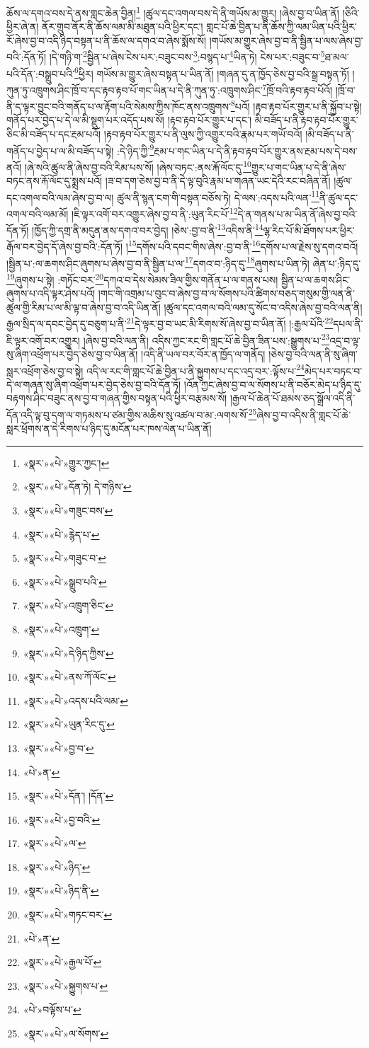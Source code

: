 ཆོས་ལ་དགའ་བས་དེ་ནས་གླང་ཆེན་བྱིན།\footnote{«སྣར་»«པེ་»གྱུར་ཀྱང་།} །ཚུལ་དང་འགལ་བས་དེ་ནི་གཡོས་མ་གྱུར། །ཞེས་བྱ་བ་ཡིན་ནོ། །ཅིའི་ཕྱིར་ཞེ་ན། ནོར་གྲུབ་ནོར་ནི་ཆོས་ལམ་མི་མཐུན་པའི་ཕྱིར་དང་། གླང་པོ་ཆེ་བྱིན་པ་ནི་ཆོས་ཀྱི་ལམ་ཡིན་པའི་ཕྱིར་རོ་ཞེས་བྱ་བ་འདི་ཉིད་བསྟན་པ་ནི་ཆོས་ལ་དགའ་བ་ཞེས་སྨོས་སོ། །གཡོས་མ་གྱུར་ཞེས་བྱ་བ་ནི་སྦྱིན་པ་ལས་ཞེས་བྱ་བའི་:དོན་ཏོ། །དེ་གཉི་ག་\footnote{«སྣར་»«པེ་»དོན་ཏེ། དེ་གཉིས་}སྦྱིན་པ་ཞེས་ངེས་པར་:བཟུང་བས་\footnote{«སྣར་»«པེ་»གཟུང་བས་}:བསྙད་པ་\footnote{«སྣར་»«པེ་»རྙེད་པ་}ཡིན་ཏེ། ངེས་པར་:བཟུང་བ་\footnote{«སྣར་»«པེ་»གཟུང་བ་}ཐ་མལ་པའི་དོན་:བསྒྲུབ་པའི་\footnote{«སྣར་»«པེ་»སྒྲུབ་པའི་}ཕྱིར། གཡོས་མ་གྱུར་ཞེས་བསྟན་པ་ཡིན་ནོ། །གཞན་དུ་ན་ཁྱོད་ཅེས་བྱ་བའི་སྒྲ་བསྟན་ཏོ། །ཀུན་ཏུ་འཁྲུགས་ཤིང་ཁྲོ་བ་དང་རྟབ་རྟབ་པོ་གང་ཡིན་པ་དེ་ནི་ཀུན་ཏུ་:འཁྲུགས་ཤིང་\footnote{«སྣར་»«པེ་»འཁྲུག་ཅིང་}ཁྲོ་བའི་རྟབ་རྟབ་པོའོ། །ཁྲོ་བ་ནི་ད་ལྟར་བྱུང་བའི་གནོད་པ་ལ་རྟོག་པའི་སེམས་ཀྱིས་ཁོང་ནས་འཁྲུགས་\footnote{«སྣར་»«པེ་»འཁྲུག་}པའོ། །རྟབ་རྟབ་པོར་གྱུར་པ་ནི་སྐྱོབ་པ་སྟེ། གནོད་པར་བྱེད་པ་དེ་ལ་མི་སྡུག་པར་འདོད་པས་སོ། །རྟབ་རྟབ་པོར་གྱུར་པ་དང་། མི་བཟོད་པ་ནི་རྟབ་རྟབ་པོར་གྱུར་ཅིང་མི་བཟོད་པ་དང་རྔམ་པའོ། །རྟབ་རྟབ་པོར་གྱུར་པ་ནི་ལུས་ཀྱི་འགྱུར་བའི་རྣམ་པར་གཡོ་བའོ། །མི་བཟོད་པ་ནི་གནོད་པ་བྱེད་པ་ལ་མི་བཟོད་པ་སྟེ། :དེ་ཉིད་ཀྱི་\footnote{«སྣར་»«པེ་»དེ་ཉིད་ཀྱིས་}རྔམ་པ་གང་ཡིན་པ་དེ་ནི་རྟབ་རྟབ་པོར་གྱུར་ནས་རྔམ་པས་དེ་བས་ནའོ། །ཞེ་སའི་ཚུལ་ནི་ཞེས་བྱ་བའི་རིམ་པས་སོ། །ཞེས་བཏང་:ནས་རྐོ་ལོང་དུ་\footnote{«སྣར་»«པེ་»ནས་ཀོ་ལོང་}གྱུར་པ་གང་ཡིན་པ་དེ་ནི་ཞེས་བཏང་ནས་རྐོ་ལོང་དུ་སྨྲས་པའོ། །ཟ་བ་དག་ཅེས་བྱ་བ་ནི་དེ་ལྟ་བུའི་རྣམ་པ་གཞན་ཡང་དེའི་རང་བཞིན་ནོ། །ཚུལ་དང་འགལ་བའི་ལམ་ཞེས་བྱ་བ་ལ། ཚུལ་ནི་སྙན་ངག་གི་བསྟན་བཅོས་ཏེ། དེ་ལས་:འདས་པའི་ལན་\footnote{«སྣར་»«པེ་»འདས་པའི་ལམ་}ནི་ཚུལ་དང་འགལ་བའི་ལམ་མོ། །ཇི་ལྟར་འགོ་བར་འགྱུར་ཞེས་བྱ་བ་ནི་:ཡུན་རིང་པོ་\footnote{«སྣར་»«པེ་»ཡུན་རིང་དུ་}དེ་ན་གནས་པ་མ་ཡིན་ནོ་ཞེས་བྱ་བའི་དོན་ཏོ། །ཁྱོད་ཀྱི་དགྲ་ནི་མདུན་ནས་དགའ་བར་བྱེད། །ཅེས་:བྱ་བ་ནི་\footnote{«སྣར་»«པེ་»བྱ་བ་}འདིས་ནི་\footnote{«པེ་»ན་}ལྷ་རིང་པོ་མི་ཐོགས་པར་ཕྱིར་རྒོལ་བར་བྱེད་དོ་ཞེས་བྱ་བའི་:དོན་ཏོ། །\footnote{«སྣར་»«པེ་»དོན་། །དོན་}དགོས་པའི་དབང་གིས་ཞེས་:བྱ་བ་ནི་\footnote{«སྣར་»«པེ་»བྱ་བའི་}དགོས་པ་ལ་རྗེས་སུ་དགའ་བའོ། །སྦྱིན་པ་:ལ་ཆགས་ཤིང་ཞུགས་པ་ཞེས་བྱ་བ་ནི་སྦྱིན་པ་ལ་\footnote{«སྣར་»«པེ་»ལ་}དགའ་བ་:ཉིད་དུ་\footnote{«སྣར་»«པེ་»ཉིད་}ཞུགས་པ་ཡིན་ཏེ། ཞེན་པ་:ཉིད་དུ་\footnote{«སྣར་»«པེ་»ཉིད་ནི་}ཞུགས་པ་སྟེ། :གཏོང་བར་\footnote{«སྣར་»«པེ་»གཏང་བར་}དཀའ་བ་དེས་སེམས་ཟིལ་གྱིས་གནོན་པ་ལ་གནས་པས། སྦྱིན་པ་ལ་ཆགས་ཤིང་ཞུགས་པ་འདི་ལྟར་ཤེས་པའོ། །གང་གི་འགྲམ་པ་བུང་བ་ཞེས་བྱ་བ་ལ་སོགས་པའི་ཚིགས་བཅད་གསུམ་གྱི་ལན་ནི་ཚུལ་གྱི་རིམ་པ་ལ་མི་ལྟ་བ་ཞེས་བྱ་བ་འདི་ཡིན་ནོ། །ཚུལ་དང་འགལ་བའི་ལམ་དུ་སོང་བ་འདིས་ཞེས་བྱ་བའི་ལན་ནི། རྒྱལ་སྲིད་ལ་དབང་བྱེད་དུ་བཅུག་པ་ནི་\footnote{«པེ་»ན་}དེ་ལྟར་བྱ་བ་ཡང་མི་རིགས་སོ་ཞེས་བྱ་བ་ཡིན་ནོ། །:རྒྱལ་པོའི་\footnote{«སྣར་»«པེ་»རྒྱལ་པོ་}དཔལ་ནི་ཇི་ལྟར་འགོ་བར་འགྱུར། །ཞེས་བྱ་བའི་ལན་ནི། འདིས་ཀྱང་རང་གི་གླང་པོ་ཆེ་བྱིན་ཟིན་པས་:སྒྱུགས་པ་\footnote{«སྣར་»«པེ་»སྐྱུགས་པ་}འདྲ་བ་ལྟ་སུ་ཞིག་འཕྲོག་པར་བྱེད་ཅེས་བྱ་བ་ཡིན་ནོ། །འདི་ནི་ཡལ་བར་བོར་ན་ཁྱོད་ལ་གནོད། །ཅེས་བྱ་བའི་ལན་ནི་སུ་ཞིག་སླར་འཕྲོག་ཅེས་བྱ་བ་སྟེ། འདི་ལ་རང་གི་གླང་པོ་ཆེ་བྱིན་པ་ནི་སྐྱུགས་པ་དང་འདྲ་བར་:ལྟོས་པ་\footnote{«པེ་»བལྟོས་པ་}མེད་པར་བཏང་བ་དེ་ལ་གཞན་སུ་ཞིག་འཕྲོག་པར་བྱེད་ཅེས་བྱ་བའི་དོན་ཏོ། །འོན་ཀྱང་ཞེས་བྱ་བ་ལ་སོགས་པ་ནི་བཅོར་མེད་པ་ཉིད་དུ་བརྟགས་ཤིང་བཟུང་ནས་བྱ་བ་གཞན་གྱིས་བསྟན་པའི་ཕྱིར་བརྩམས་སོ། །རྒྱལ་པོ་ཆེན་པོ་ཐམས་ཅད་སྒྲོལ་འདི་ནི་དོན་འདི་ལྟ་བུ་དག་ལ་གཏམས་པ་ཙམ་གྱིས་མཆིས་སུ་འཚལ་བ་མ་:ལགས་སོ་\footnote{«སྣར་»«པེ་»ལ་སོགས་}ཞེས་བྱ་བ་འདིས་ནི་གླང་པོ་ཆེ་སླར་ཕྲོགས་ན་དེ་རིགས་པ་ཉིད་དུ་མངོན་པར་ཁས་ལེན་པ་ཡིན་ནོ། 